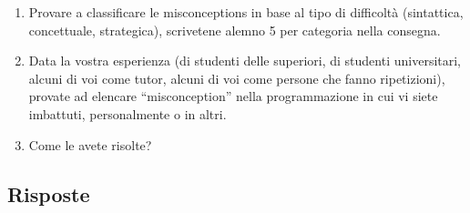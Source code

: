 \documentclass[a4paper]{article}
\begin{document}
\begin{enumerate}

	\item Provare a classificare le misconceptions in base al tipo di  difficoltà (sintattica, concettuale, strategica), scrivetene alemno 5 per categoria nella consegna.
	\item Data la vostra esperienza (di studenti delle superiori, di studenti universitari, alcuni di voi come tutor, alcuni di voi come persone che fanno ripetizioni), provate ad elencare “misconception” nella programmazione in cui vi siete imbattuti, personalmente o in altri.
	\item Come le avete risolte?
\end{enumerate}
\subsection{Risposte}
\end{document}
